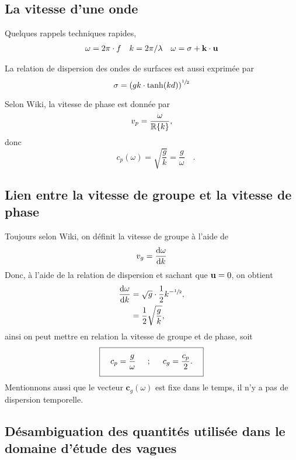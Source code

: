 \documentclass[10pt]{article}
\numberwithin{equation}{section}
\newcommand{\uu}{\vb{u}}
\newcommand{\venti}{\vphantom{\sum_x^x}}
\begin{document}
\subsection{La vitesse d'une onde}
\label{sec:org5caa36b}
Quelques rappels techniques rapides, 
\begin{align}
   \omega = 2\pi \cdot f && k = 2\pi / \lambda && \omega = \sigma + \mathbf{k}\cdot \uu 
\end{align}

La relation de dispersion des ondes de surfaces est aussi exprimée par
\begin{equation}
\label{eq:orgde57527}
   \sigma = \qty(gk\cdot \tanh(kd))^{\sfrac{1}{2}}
\end{equation}

Selon Wiki, la vitesse de phase est donnée par
\begin{equation}
   v_p = \frac{\omega}{\mathbb{R} \qty{k}},
\end{equation}
donc
\begin{equation}
   \boxed{\quad c_p(\omega) = \sqrt{\frac{g}{k}} = \frac{g}{\omega}\quad}.
\end{equation}
\subsection{Lien entre la vitesse de groupe et la vitesse de phase}
\label{sec:org167c655}

Toujours selon Wiki, on définit la vitesse de groupe à l'aide de
\begin{equation}
   v_g = \dv{\omega}{k}
\end{equation}
Donc, à l'aide de la relation de dispersion et sachant que \(\uu = 0\), on obtient
\begin{align}
   \dv{\omega}{k} &= \sqrt{g} \cdot \frac{1}{2} k^{-\sfrac{1}{2}},\nonumber\\
     &= \frac{1}{2}\sqrt{\frac{g}{k}},\nonumber\\
\end{align}
ainsi on peut mettre en relation la vitesse de groupe et de phase, soit
\begin{equation}
   \boxed{\quad c_p = \venti\frac{g}{\omega}\hspace{0.5cm};\hspace{0.5cm} c_g = \frac{c_p}{2}.\quad}
\end{equation}
Mentionnons aussi que le vecteur \(\mathbf{c}_g(\omega)\) est fixe dans le temps, il n'y a pas de dispersion temporelle.
\subsection{Désambiguation des quantités utilisée dans le domaine d'étude des vagues}
\label{sec:org33b2bf0}
\end{document}
